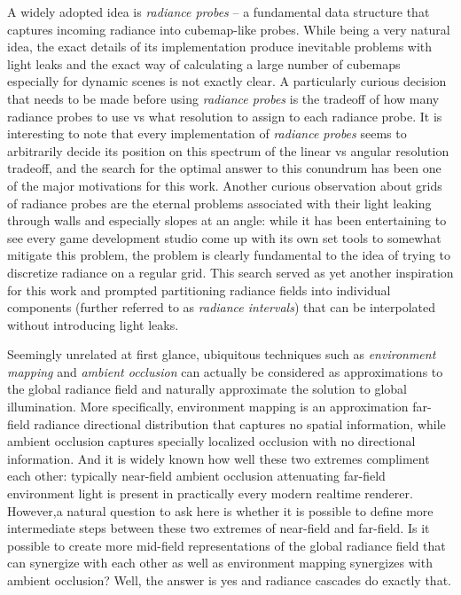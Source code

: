 \documentclass{jcgt}
\begin{document}
A widely adopted idea is \emph{radiance probes} -- a fundamental data structure that captures incoming radiance into cubemap-like probes. While
being a very natural idea, the exact details of its implementation produce inevitable problems with light leaks and the exact way of calculating a large number of cubemaps especially for dynamic scenes is not exactly clear. A particularly curious decision that needs to be made before using \emph{radiance probes} is the tradeoff of how many radiance probes to use vs
what resolution to assign to each radiance probe. It is interesting to note that every implementation of \emph{radiance probes} seems to arbitrarily decide its position on this spectrum of the linear vs angular resolution tradeoff, and the search for the optimal answer to this conundrum has been one of the major motivations for this work. Another curious observation about grids of radiance probes are the eternal problems associated with their light leaking through walls and especially slopes at an angle: while it has been entertaining to see every game development studio come up with its own set tools to somewhat mitigate this problem, the problem is clearly fundamental to the idea of trying to discretize radiance on a regular grid. This search served as yet another inspiration for this work and prompted partitioning radiance fields into individual components (further referred to as \emph{radiance intervals}) that can be interpolated without introducing light leaks.

Seemingly unrelated at first glance, ubiquitous techniques such as \emph{environment mapping} and \emph{ambient occlusion} can actually be considered as approximations to the global radiance field and
naturally approximate the solution to global illumination. More specifically, environment mapping is an approximation far-field radiance directional distribution that captures no spatial information, while ambient occlusion captures specially localized occlusion with no directional information. And it is widely known how well these two extremes compliment each other: typically near-field ambient occlusion attenuating far-field environment light is present in practically every modern realtime renderer. However,a natural question to ask here is whether it is possible to define more intermediate steps between these two extremes of near-field and far-field. Is it possible to create more mid-field representations of the global radiance field that can synergize with each other as well as environment mapping synergizes with ambient occlusion? Well, the answer is yes and radiance cascades do exactly that.
\end{document}
